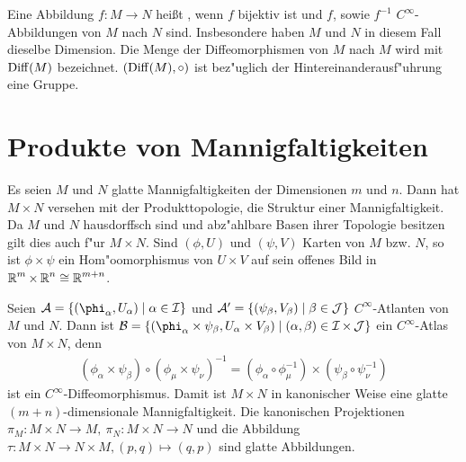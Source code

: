 \begin{Dfn}[Diffeomorphismus]
Eine Abbildung $f \colon M \to N$ hei\ss t , wenn $f$ bijektiv ist und $f$, sowie $f^{-1}$ $C^{\infty}$-Abbildungen von $M$ nach $N$ sind. Insbesondere haben $M$ und $N$ in diesem Fall dieselbe Dimension. Die Menge der Diffeomorphismen von $M$ nach $M$ wird mit $\operatorname{Diff}(M)$ bezeichnet. $(\operatorname{Diff}(M), \circ)$ ist bez"uglich der Hintereinanderausf"uhrung eine Gruppe.
\end{Dfn}



\section{Produkte von Mannigfaltigkeiten}

Es seien $M$ und $N$ glatte Mannigfaltigkeiten der Dimensionen $m$ und $n$. Dann hat $M \times N$ versehen mit der \gls{Produkttopologie}, die Struktur einer Mannigfaltigkeit. Da $M$ und $N$ hausdorffsch sind und abz"ahlbare Basen ihrer Topologie besitzen gilt dies auch f"ur $M \times N$.
Sind $(\phi, U)$ und $(\psi, V)$ Karten von $M$ bzw. $N$, so ist $\phi \times \psi$ ein Hom"oomorphismus von $U \times V$ auf sein offenes Bild in $\operatorname{\mathbb{R}}^m \times \operatorname{\mathbb{R}}^n \cong \operatorname{\mathbb{R}}^{m + n}$.

Seien $\mathcal A = \{(\phi_{\alpha}, U_{\alpha}) \mid \alpha \in \calI \}$ und $\mathcal A' = \{(\psi_{\beta}, V_{\beta}) \mid \beta \in \operatorname{\mathcal{J}}\}$ $C^{\infty}$-Atlanten von $M$ und $N$. Dann ist $\mathcal B = \{(\phi_{\alpha}\times\psi_{\beta},U_{\alpha}\times V_{\beta}) \mid (\alpha, \beta) \in \calI \times \calJ\}$ ein $C^{\infty}$-Atlas von $M\times N$, denn 
\begin{align*}
  (\phi_{\alpha} \times \psi_{\beta}) \circ (\phi_{\mu} \times \psi_{\nu})^{-1} = (\phi_{\alpha} \circ \phi_{\mu}^{-1}) \times (\psi_{\beta} \circ \psi_{\nu}^{-1})
\end{align*}
ist ein $C^{\infty}$-Diffeomorphismus. Damit ist $M\times N$ in kanonischer Weise eine glatte $(m+n)$-dimensionale Mannigfaltigkeit. Die kanonischen Projektionen $\pi_M\colon M\times N \to M, \ \pi_N\colon M \times N \to N$ und die Abbildung $\tau \colon M \times N \to N \times M, (p,q) \mapsto (q,p)$ sind glatte Abbildungen.

